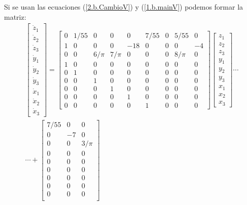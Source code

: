 \documentclass[letterpaper, 12pt]{article}
\begin{document}
\begin{enumerate}
\begin{enumerate}
Si se usan las ecuaciones (\ref{2.b.CambioV}) y (\ref{1.b.mainV}) podemos formar la matriz: \
\begin{multline*}
\begin{bmatrix}
\dot{z}_1\\ 
\dot{z}_2\\ 
\dot{z}_3\\ 
\dot{y}_1\\ 
\dot{y}_2\\ 
\dot{y}_3\\ 
\dot{x}_1\\ 
\dot{x}_2\\ 
\dot{x}_3
\end{bmatrix}
=
\begin{bmatrix}
0 &1/55  &0  &0  &0  &7/55  &0  &5/55  &0 \\ 
1 &0  &0  &0  &-18  &0  &0  &0  &-4 \\ 
0 &0  &6/\pi &7/\pi   &0  &0  &0  &8/\pi   &0 \\ 
1 &0  &0  &0  &0  &0  &0  &0  &0 \\ 
0 &1  &0  &0  &0  &0  &0  &0  &0 \\ 
0 &0  &1  &0  &0  &0  &0  &0  &0 \\ 
0 &0  &0  &1  &0  &0  &0  &0  &0 \\ 
0 &0  &0  &0  &1  &0  &0  &0  &0 \\ 
0 &0  &0  &0  &0  &1  &0  &0  &0 
\end{bmatrix}
\begin{bmatrix}
z_1\\ 
z_2\\ 
z_3\\ 
y_1\\ 
y_2\\ 
y_3\\ 
x_1\\ 
x_2\\ 
x_3
\end{bmatrix}
\cdots \\
\cdots +
\begin{bmatrix}
7/55 &0  &0   \\ 
0 &-7  &0   \\ 
0 &0  &3/\pi \\
0  &0  &0 \\
0  &0  &0 \\
0  &0  &0 \\
0  &0  &0 \\
0  &0  &0 \\
0  &0  &0 \\
\end{bmatrix}

\end{multline*}
\end{enumerate}
\end{enumerate}
\end{document}

